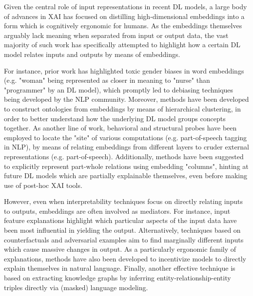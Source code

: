 Given the central role of input representations in recent DL models, a large body of advances in XAI has focused on distilling high-dimensional embeddings into a form which is cognitively ergonomic for humans. As the embeddings themselves arguably lack meaning when separated from input or output data, the vast majority of such work has specifically attempted to highlight how a certain DL model relates inputs and outputs by means of embeddings.

For instance, prior work has highlighted toxic gender biases in word embeddings (e.g. "woman" being represented as closer in meaning to "nurse" than "programmer" by an DL model), which promptly led to debiasing techniques being developed by the NLP community. Moreover, methods have been developed to construct ontologies from embeddings by means of hierarchical clustering, in order to better understand how the underlying DL model groups concepts together. As another line of work, behavioral and structural probes have been employed to locate the "site" of various computations (e.g. part-of-speech tagging in NLP), by means of relating embeddings from different layers to cruder external representations (e.g. part-of-speech). Additionally, methods have been suggested to explicitly represent part-whole relations using embedding "columns", hinting at future DL models which are partially explainable themselves, even before making use of post-hoc XAI tools.

However, even when interpretability techniques focus on directly relating inputs to outputs, embeddings are often involved as mediators. For instance, input feature explanations highlight which particular aspects of the input data have been most influential in yielding the output. Alternatively, techniques based on counterfactuals and adversarial examples aim to find marginally different inputs which cause massive changes in output. As a particularly ergonomic family of explanations, methods have also been developed to incentivize models to directly explain themselves in natural language. Finally, another effective technique is based on extracting knowledge graphs by inferring entity-relationship-entity triples directly via (masked) language modeling.


